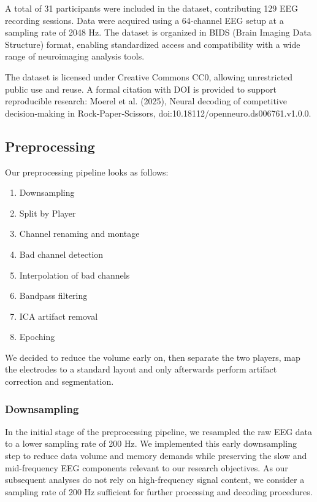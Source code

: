 \documentclass{article}
\theoremstyle{plain}
\theoremstyle{definition}
\theoremstyle{remark}
\begin{document}
A total of 31 participants were included in the dataset, contributing 129 EEG recording sessions. Data were acquired using a 64‑channel EEG setup at a sampling rate of 2048 Hz. The dataset is organized in BIDS (Brain Imaging Data Structure) format, enabling standardized access and compatibility with a wide range of neuroimaging analysis tools.

The dataset is licensed under Creative Commons CC0, allowing unrestricted public use and reuse. A formal citation with DOI is provided to support reproducible research: Moerel et al. (2025), Neural decoding of competitive decision‑making in Rock‑Paper‑Scissors, doi:10.18112/openneuro.ds006761.v1.0.0.

\subsection{Preprocessing}
\label{sec:preprocessing}
Our preprocessing pipeline looks as follows:
\begin{enumerate}
    \item Downsampling
    \item Split by Player
    \item Channel renaming and montage
    \item Bad channel detection
    \item Interpolation of bad channels
    \item Bandpass filtering
    \item ICA artifact removal
    \item Epoching
\end{enumerate}

We decided to reduce the volume early on, then separate the two players, map the electrodes to a standard layout and only afterwards perform artifact correction and segmentation.

\subsubsection{Downsampling}
In the initial stage of the preprocessing pipeline, we resampled the raw EEG data to a lower sampling rate of 200 Hz. We implemented this early downsampling step to reduce data volume and memory demands while preserving the slow and mid-frequency EEG components relevant to our research objectives. As our subsequent analyses do not rely on high-frequency signal content, we consider a sampling rate of 200 Hz sufficient for further processing and decoding procedures.
\end{document}
